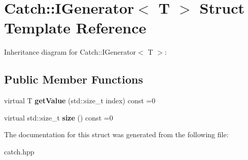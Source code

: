 \hypertarget{struct_catch_1_1_i_generator}{}\section{Catch\+:\+:I\+Generator$<$ T $>$ Struct Template Reference}
\label{struct_catch_1_1_i_generator}


Inheritance diagram for Catch\+:\+:I\+Generator$<$ T $>$\+:
\subsection*{Public Member Functions}
\begin{DoxyCompactItemize}
\item 
\mbox{\label{struct_catch_1_1_i_generator_ad69e937cb66dba3ed9429c42abf4fce3}} 
virtual T {\bfseries get\+Value} (std\+::size\+\_\+t index) const =0
\item 
\mbox{\label{struct_catch_1_1_i_generator_a2e317253b03e838b6065ce69719a198e}} 
virtual std\+::size\+\_\+t {\bfseries size} () const =0
\end{DoxyCompactItemize}


The documentation for this struct was generated from the following file\+:\begin{DoxyCompactItemize}
\item 
catch.\+hpp\end{DoxyCompactItemize}
